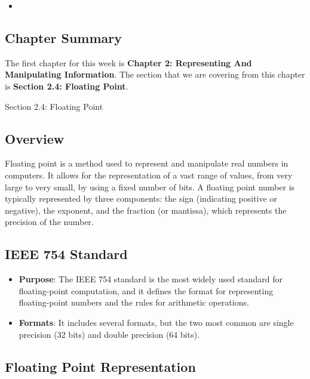 \begin{itemize}
    \item {} \textbullet {} 
\end{itemize}

\subsection{Chapter Summary}

The first chapter for this week is \textbf{Chapter 2: Representing And Manipulating Information}. The section that we are covering from this chapter is \textbf{Section 2.4: Floating Point}.

\begin{notes}{Section 2.4: Floating Point}
    \subsection*{Overview}

    Floating point is a method used to represent and manipulate real numbers in computers. It allows for the representation of a vast range of values, from very large to very small, by using a fixed 
    number of bits. A floating point number is typically represented by three components: the sign (indicating positive or negative), the exponent, and the fraction (or mantissa), which represents 
    the precision of the number. \vspace*{1em}

    \subsection*{IEEE 754 Standard}

    \begin{itemize}
        \item \textbf{Purpose}: The IEEE 754 standard is the most widely used standard for floating-point computation, and it defines the format for representing floating-point numbers and the rules 
        for arithmetic operations.
        \item \textbf{Formats}: It includes several formats, but the two most common are single precision (32 bits) and double precision (64 bits).
    \end{itemize}

    \subsection*{Floating Point Representation}


\end{notes}
